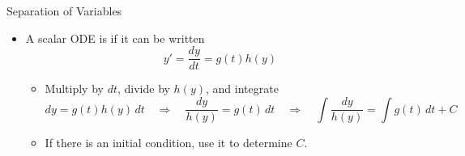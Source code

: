 \begin{frame}{Separation of Variables}
\begin{itemize}
  \item A scalar ODE is  if it can be written
  \[
    y'= \frac{dy}{dt} = g(t)h(y)
  \]
\begin{itemize}
  \item Multiply by $dt$, divide by $h(y)$,  and integrate
  \[
    dy=g(t)h(y)\,dt
    \quad\Longrightarrow\quad
    \frac{dy}{h(y)}=g(t)\,dt
    \quad\Longrightarrow\quad
    \int\frac{dy}{h(y)}=\int g(t)\,dt+C
  \]  \item If there is an initial condition, use it to determine $C$. 
\end{itemize}
\end{itemize}
\end{frame}
